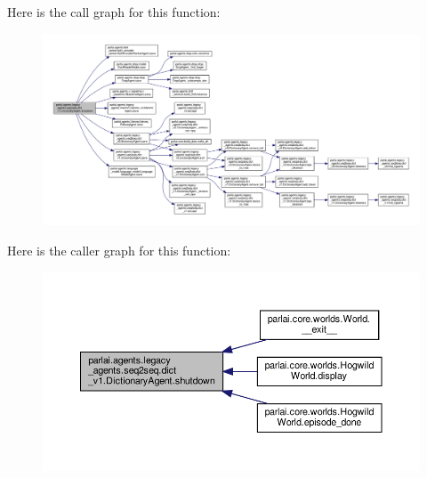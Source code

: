 Here is the call graph for this function\+:
\nopagebreak
\begin{figure}[H]
\begin{center}
\leavevmode
\includegraphics[width=350pt]{classparlai_1_1agents_1_1legacy__agents_1_1seq2seq_1_1dict__v1_1_1DictionaryAgent_a7758fcd79e9a391b4f4bd45e030fc59b_cgraph}
\end{center}
\end{figure}
Here is the caller graph for this function\+:
\nopagebreak
\begin{figure}[H]
\begin{center}
\leavevmode
\includegraphics[width=350pt]{classparlai_1_1agents_1_1legacy__agents_1_1seq2seq_1_1dict__v1_1_1DictionaryAgent_a7758fcd79e9a391b4f4bd45e030fc59b_icgraph}
\end{center}
\end{figure}
\mbox{\label{classparlai_1_1agents_1_1legacy__agents_1_1seq2seq_1_1dict__v1_1_1DictionaryAgent_aa2697be1f1556da06f77d7eadf7cb9c6}} 
